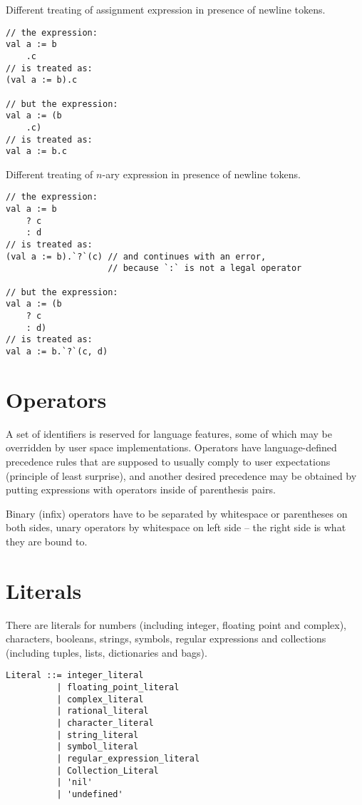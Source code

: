 \example Different treating of assignment expression in presence of newline tokens. 
\begin{lstlisting}
// the expression:
val a := b
    .c
// is treated as:
(val a := b).c

// but the expression:
val a := (b
    .c)
// is treated as:
val a := b.c 
\end{lstlisting}

\example Different treating of $n$-ary expression in presence of newline tokens.
\begin{lstlisting}
// the expression:
val a := b
    ? c
    : d
// is treated as:
(val a := b).`?`(c) // and continues with an error,
                    // because `:` is not a legal operator

// but the expression:
val a := (b
    ? c
    : d)
// is treated as:
val a := b.`?`(c, d) 
\end{lstlisting}






\section{Operators}\label{sec:operators}
A set of identifiers is reserved for language features, some of which may be overridden by user space implementations. Operators have language-defined precedence rules that are supposed to usually comply to user expectations (principle of least surprise), and another desired precedence may be obtained by putting expressions with operators inside of parenthesis pairs. 

Binary (infix) operators have to be separated by whitespace or parentheses on both sides, unary operators by whitespace on left side -- the right side is what they are bound to. 






\section{Literals}\label{sec:literals}

There are literals for numbers (including integer, floating point and complex), characters, booleans, strings, symbols, regular expressions and collections (including tuples, lists, dictionaries and bags). 

\syntax\begin{lstlisting}
Literal ::= integer_literal
	      | floating_point_literal
	      | complex_literal
	      | rational_literal
	      | character_literal
	      | string_literal
	      | symbol_literal
	      | regular_expression_literal
	      | Collection_Literal
	      | 'nil'
	      | 'undefined'
\end{lstlisting}






